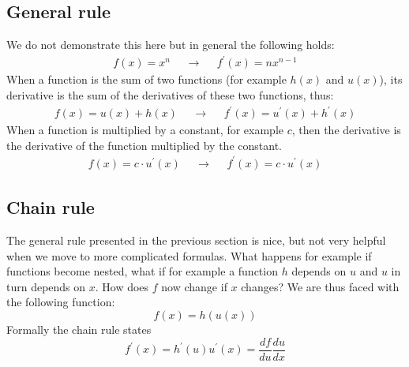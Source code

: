 \documentclass[a4paper]{report}
\begin{document}
\subsection{General rule}
We do not demonstrate this here but in general the following holds:
\begin{align}
f(x)=x^n & &\rightarrow & &f^\prime(x)=nx^{n-1}
\end{align}
When a function is the sum of two functions (for example $h(x)$ and $u(x)$), its derivative is the sum of the derivatives of these two functions, thus:
\begin{align}
f(x)=u(x)+h(x)& &\rightarrow & & f^\prime(x)=u^\prime(x)+h^\prime(x)
\end{align}
When a function is multiplied by a constant, for example $c$, then the derivative is the derivative of the function multiplied by the constant.
\begin{align}
f(x)=c\cdot u^\prime(x)& &\rightarrow & & f^\prime(x)=c\cdot u^\prime(x)
\end{align}

\subsection{Chain rule}
The general rule presented in the previous section is nice, but not very helpful when we move to more complicated formulas. What happens for example if functions become nested, what if for example a function $h$ depends on $u$ and $u$ in turn depends on $x$. How does $f$ now change if $x$ changes? We are thus faced with the following function:
\begin{equation}
f(x) = h(u(x))
\end{equation}
Formally the chain rule states
\begin{equation}
f^\prime(x)=h^\prime(u) u^\prime(x) = \frac{df}{du}\frac{du}{dx}
\end{equation}
\end{document}
